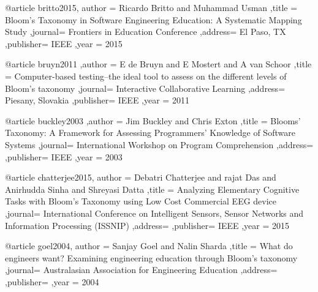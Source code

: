 @article{ britto2015,
   author = {Ricardo Britto and Muhammad Usman}
  ,title  = {Bloom’s Taxonomy in Software Engineering Education: A Systematic Mapping Study}
  ,journal= {Frontiers in Education Conference}
  ,address= {El Paso, TX}
  ,publisher= {IEEE}
  ,year   = {2015}
}

@article{ bruyn2011
  ,author = {E de Bruyn and E Mostert and A van Schoor}
  ,title  = {Computer-based testing--the ideal tool to assess on the different levels of Bloom’s taxonomy}
  ,journal= {Interactive Collaborative Learning}
  ,address= {Piesany, Slovakia}
  ,publisher= {IEEE}
  ,year   = {2011}
}

@article{ buckley2003
  ,author = {Jim Buckley and Chris Exton}
  ,title  = {Blooms’ Taxonomy: A Framework for Assessing Programmers’ Knowledge of Software Systems}
  ,journal= {International Workshop on Program Comprehension}
  ,address= {}
  ,publisher= {IEEE}
  ,year   = {2003}
}

@article{ chatterjee2015,
   author = {Debatri Chatterjee and rajat Das and Anirhudda Sinha and Shreyasi Datta}
  ,title  = {Analyzing Elementary Cognitive Tasks with Bloom's Taxonomy using Low Cost Commercial EEG device} 
  ,journal= {International Conference on Intelligent Sensors, Sensor Networks and Information Processing (ISSNIP)}
  ,address= {}
  ,publisher= {IEEE}
  ,year   = {2015}
}

@article{ goel2004,
   author = {Sanjay Goel and Nalin Sharda}
  ,title  = {What do engineers want? Examining engineering education through Bloom's taxonomy}
  ,journal= {Australasian Association for Engineering Education}
  ,address= {}
  ,publisher= {}
  ,year   = {2004}
}

